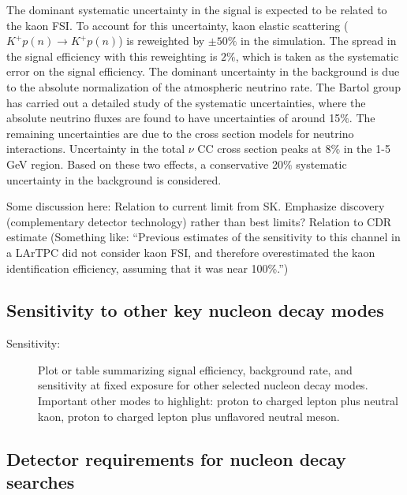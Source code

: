 The dominant systematic uncertainty in the signal is expected to be related to the kaon FSI. To account for this uncertainty, kaon elastic scattering ($K^{+}p(n)\rightarrow K^{+}p(n)$) is reweighted by $\pm 50\%$ in the simulation. The spread in the signal efficiency with this reweighting is $2\%$, which is taken as the  systematic error on the signal efficiency.
The dominant uncertainty in the background 
is due to the absolute normalization of the atmospheric neutrino rate. The Bartol group has carried out a detailed study of the systematic uncertainties, where the absolute neutrino fluxes are found to have uncertainties of around 15$\%$.
The remaining uncertainties are due to the cross section models for neutrino interactions. Uncertainty in the total $\nu$ CC cross section peaks at 8$\%$ in the 1-5 GeV region.
Based on these two effects, a conservative 20$\%$ systematic uncertainty in the background is considered.

Some discussion here: Relation to current limit from SK. Emphasize discovery (complementary detector technology) rather than best limits? Relation to CDR estimate (Something like: ``Previous estimates of the sensitivity to this channel in a LArTPC did not consider kaon FSI, and therefore overestimated the kaon identification efficiency, assuming that it was near 100\%.'')

\subsection{Sensitivity to other key nucleon decay modes}
\label{subsec:nonaccel-ndk-other}


\begin{description}
\item[Sensitivity:] Plot or table summarizing signal efficiency, background rate, and sensitivity at fixed exposure for other selected nucleon decay modes. Important other modes to highlight: proton to charged lepton plus neutral kaon, proton to charged lepton plus unflavored neutral meson.
\end{description}


\subsection{Detector requirements for nucleon decay searches}
\label{subsec:nonaccel-ndk-requirements}

